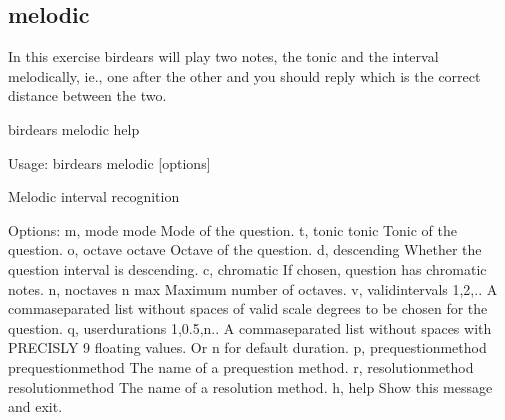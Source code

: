 \documentclass[letterpaper,10pt,english]{sphinxmanual}
\begin{document}
\subsection{melodic}
\label{\detokenize{index:melodic}}
In this exercise birdears will play two notes, the tonic and the interval
melodically, ie., one after the other and you should reply which is the
correct distance between the two.

%
\begin{sphinxVerbatim}[commandchars=\\\{\}]
birdears melodic \PYGZhy{}\PYGZhy{}help
\end{sphinxVerbatim}

%
\begin{sphinxVerbatim}[commandchars=\\\{\}]
Usage: birdears melodic [options]

  Melodic interval recognition

Options:
  \PYGZhy{}m, \PYGZhy{}\PYGZhy{}mode \PYGZlt{}mode\PYGZgt{}               Mode of the question.
  \PYGZhy{}t, \PYGZhy{}\PYGZhy{}tonic \PYGZlt{}tonic\PYGZgt{}             Tonic of the question.
  \PYGZhy{}o, \PYGZhy{}\PYGZhy{}octave \PYGZlt{}octave\PYGZgt{}           Octave of the question.
  \PYGZhy{}d, \PYGZhy{}\PYGZhy{}descending                Whether the question interval is descending.
  \PYGZhy{}c, \PYGZhy{}\PYGZhy{}chromatic                 If chosen, question has chromatic notes.
  \PYGZhy{}n, \PYGZhy{}\PYGZhy{}n\PYGZus{}octaves \PYGZlt{}n max\PYGZgt{}         Maximum number of octaves.
  \PYGZhy{}v, \PYGZhy{}\PYGZhy{}valid\PYGZus{}intervals \PYGZlt{}1,2,..\PYGZgt{}  A comma\PYGZhy{}separated list without spaces
                                  of valid scale degrees to be chosen for the
                                  question.
  \PYGZhy{}q, \PYGZhy{}\PYGZhy{}user\PYGZus{}durations \PYGZlt{}1,0.5,n..\PYGZgt{}
                                  A comma\PYGZhy{}separated list without
                                  spaces with PRECISLY 9 floating values. Or
                                  \PYGZsq{}n\PYGZsq{} for default              duration.
  \PYGZhy{}p, \PYGZhy{}\PYGZhy{}prequestion\PYGZus{}method \PYGZlt{}prequestion\PYGZus{}method\PYGZgt{}
                                  The name of a pre\PYGZhy{}question method.
  \PYGZhy{}r, \PYGZhy{}\PYGZhy{}resolution\PYGZus{}method \PYGZlt{}resolution\PYGZus{}method\PYGZgt{}
                                  The name of a resolution method.
  \PYGZhy{}h, \PYGZhy{}\PYGZhy{}help                      Show this message and exit.


\end{sphinxVerbatim}
\end{document}
